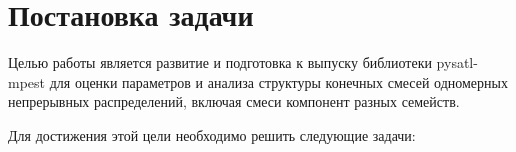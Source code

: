 
\section{Постановка задачи}
\label{sec:task}


Целью работы является развитие и подготовка к выпуску библиотеки pysatl-mpest для оценки параметров и анализа структуры конечных смесей одномерных непрерывных распределений, включая смеси компонент разных семейств.

Для достижения этой цели необходимо решить следующие задачи:

